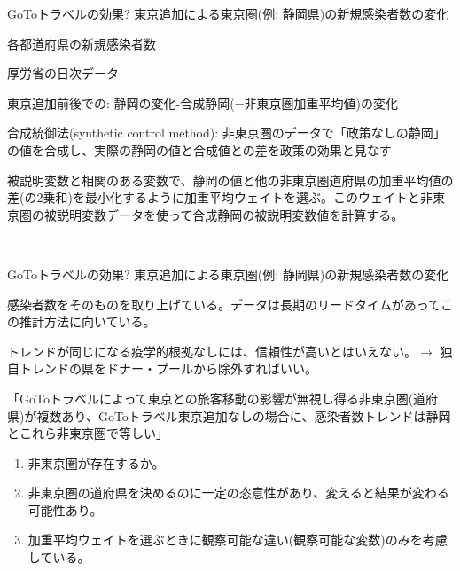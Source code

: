 \begin{frame}[t, label=GoToShizuoka]{GoToトラベルの効果?}
東京追加による東京圏(例: 静岡県)の新規感染者数の変化
\begin{description}
\vspace{1.0ex}\setlength{\itemsep}{1.0ex}\setlength{\baselineskip}{12pt}
\pause
\item[被説明変数]	各都道府県の新規感染者数
\pause
\item[データ]	厚労省の日次データ
\pause
\item[効果]	東京追加前後での: 静岡の変化-合成静岡(=非東京圏加重平均値)の変化
\pause
\item[推計量]	合成統御法(synthetic control method): 非東京圏のデータで「政策なしの静岡」の値を合成し、実際の静岡の値と合成値との差を政策の効果と見なす
	\begin{dinglist}{45}\scriptsize
	\vspace{1.0ex}\setlength{\itemsep}{1.0ex}\setlength{\baselineskip}{9pt}
	\item	被説明変数と相関のある変数で、静岡の値と他の非東京圏道府県の加重平均値の差(の2乗和)を最小化するように加重平均ウェイトを選ぶ。このウェイトと非東京圏の被説明変数データを使って合成静岡の被説明変数値を計算する。
	\end{dinglist}
\end{description}
\pause
\hfill\hyperlink{SCMSuitedData<4>}{}\\
\hfill\hyperlink{SCM}{}
\end{frame}

\begin{frame}[t]{GoToトラベルの効果?}
東京追加による東京圏(例: 静岡県)の新規感染者数の変化
\begin{description}
\vspace{1.0ex}\setlength{\itemsep}{1.0ex}\setlength{\baselineskip}{12pt}
\pause
\item[長所]	感染者数をそのものを取り上げている。データは長期のリードタイムがあってこの推計方法に向いている。
\pause
\item[短所]	トレンドが同じになる疫学的根拠なしには、信頼性が高いとはいえない。$\rightarrow$ 独自トレンドの県をドナー・プールから除外すればいい。
\pause
\item[識別仮定identification assumption]	「GoToトラベルによって東京との旅客移動の影響が無視し得る非東京圏(道府県)が複数あり、GoToトラベル東京追加なしの場合に、感染者数トレンドは静岡とこれら非東京圏で等しい」
\pause
\item[課題] 
	\begin{enumerate}
	\vspace{1.0ex}\setlength{\itemsep}{1.0ex}\setlength{\baselineskip}{12pt}
\pause
	\item	非東京圏が存在するか。
\pause
	\item	非東京圏の道府県を決めるのに一定の恣意性があり、変えると結果が変わる可能性あり。
\pause
	\item	加重平均ウェイトを選ぶときに観察可能な違い(観察可能な変数)のみを考慮している。
	\end{enumerate}
\end{description}
\end{frame}



